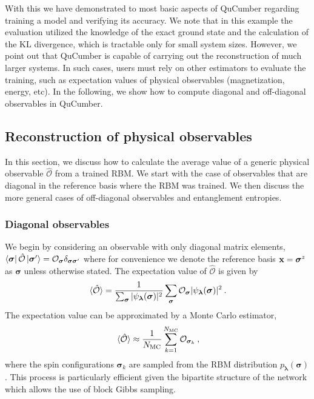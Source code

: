 \documentclass[submission, Phys, hidelnks]{SciPost}
\begin{document}
With this we have demonstrated to most basic aspects of QuCumber regarding
training a model and verifying its accuracy. We note that in this example the
evaluation utilized the knowledge of the exact ground state and the calculation
of the KL divergence, which is tractable only for small system sizes.  However,
we point out that QuCumber is capable of carrying out the reconstruction of much
larger systems. In such cases, users must rely on other estimators to evaluate
the training, such as expectation values of physical observables (magnetization,
energy, etc). In the following, we show how to compute diagonal and
off-diagonal observables in QuCumber.

\subsection{Reconstruction of physical observables}\label{Sec:Sampling_a-Trained_RBM}
In this section, we discuss how to calculate the average value of a generic
physical observable $\hat{\mathcal{O}}$ from a trained RBM.\@
We start with the case of observables that are diagonal in the reference basis
where the RBM was trained. We then discuss the more general cases of
off-diagonal observables and entanglement entropies.

\subsubsection{Diagonal observables}
We begin by considering an observable with only diagonal matrix elements,
$\bra{ \bm{\sigma} } \hat{\mathcal{O}} \ket{ \bm{\sigma}^{\prime} }=\mathcal{O}_{\bm{\sigma}}\delta_{\bm{\sigma\sigma}^\prime}$
where for convenience we denote the reference basis ${\bf x}=\bm{\sigma}^z$ as
$\bm{\sigma}$ unless otherwise stated.
The expectation value of $\hat{\mathcal{O}}$ is given by
\begin{equation}
    \ev*{\hat{\mathcal{O}}} = \frac{1}{\sum_{\bm{\sigma}} |\psi_{\bm{\lambda}}(\bm{\sigma})|^2}
    \sum_{\bm{\sigma}} \mathcal{O}_{\bm{\sigma}}|\psi_{\bm{\lambda}}(\bm{\sigma})|^2\:.
\end{equation}
The expectation value can be approximated by a Monte Carlo estimator,
\begin{equation}
    \ev*{\hat{\mathcal{O}}} \approx \frac{1}{N_{\rm MC}} \sum_{k=1}^{N_{\rm MC}} \mathcal{O}_{\bm{\sigma}_k}\:,
\end{equation}
where the spin configurations $\bm{\sigma}_k$ are sampled from the RBM
distribution $p_{\bm{\lambda}}(\bm{\sigma})$. This process is particularly
efficient given the bipartite structure of the network which allows the use
of block Gibbs sampling.
\end{document}
